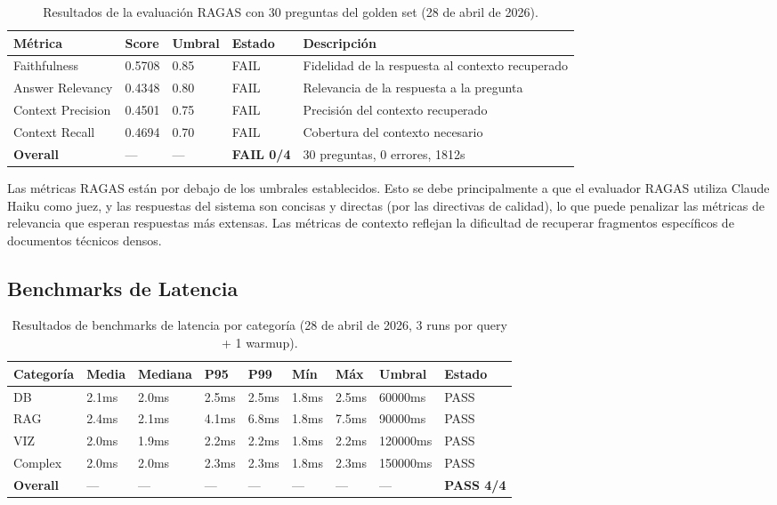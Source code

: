 ﻿\documentclass[11pt,a4paper]{article}
\begin{document}
\begin{table}[H]
\centering
\caption{Resultados de la evaluaci\'on RAGAS con 30 preguntas del golden set (28 de abril de 2026).}
\label{tab:ragas}
\begin{tabularx}{\textwidth}{lllll}
\toprule
\textbf{M\'etrica} & \textbf{Score} & \textbf{Umbral} & \textbf{Estado} & \textbf{Descripci\'on} \\
\midrule
Faithfulness & 0.5708 & 0.85 & \textcolor{accent}{FAIL} & Fidelidad de la respuesta al contexto recuperado \\
Answer Relevancy & 0.4348 & 0.80 & \textcolor{accent}{FAIL} & Relevancia de la respuesta a la pregunta \\
Context Precision & 0.4501 & 0.75 & \textcolor{accent}{FAIL} & Precisi\'on del contexto recuperado \\
Context Recall & 0.4694 & 0.70 & \textcolor{accent}{FAIL} & Cobertura del contexto necesario \\
\midrule
\textbf{Overall} & --- & --- & \textbf{\textcolor{accent}{FAIL 0/4}} & 30 preguntas, 0 errores, 1812s \\
\bottomrule
\end{tabularx}
\end{table}

Las m\'etricas RAGAS est\'an por debajo de los umbrales establecidos. Esto se debe principalmente a que el evaluador RAGAS utiliza Claude Haiku como juez, y las respuestas del sistema son concisas y directas (por las directivas de calidad), lo que puede penalizar las m\'etricas de relevancia que esperan respuestas m\'as extensas. Las m\'etricas de contexto reflejan la dificultad de recuperar fragmentos espec\'ificos de documentos t\'ecnicos densos.

\subsection{Benchmarks de Latencia}

\begin{table}[H]
\centering
\caption{Resultados de benchmarks de latencia por categor\'ia (28 de abril de 2026, 3 runs por query + 1 warmup).}
\label{tab:latency}
\begin{tabularx}{\textwidth}{lllllllll}
\toprule
\textbf{Categor\'ia} & \textbf{Media} & \textbf{Mediana} & \textbf{P95} & \textbf{P99} & \textbf{M\'in} & \textbf{M\'ax} & \textbf{Umbral} & \textbf{Estado} \\
\midrule
DB & 2.1ms & 2.0ms & 2.5ms & 2.5ms & 1.8ms & 2.5ms & 60000ms & \textcolor{success}{PASS} \\
RAG & 2.4ms & 2.1ms & 4.1ms & 6.8ms & 1.8ms & 7.5ms & 90000ms & \textcolor{success}{PASS} \\
VIZ & 2.0ms & 1.9ms & 2.2ms & 2.2ms & 1.8ms & 2.2ms & 120000ms & \textcolor{success}{PASS} \\
Complex & 2.0ms & 2.0ms & 2.3ms & 2.3ms & 1.8ms & 2.3ms & 150000ms & \textcolor{success}{PASS} \\
\midrule
\textbf{Overall} & --- & --- & --- & --- & --- & --- & --- & \textbf{\textcolor{success}{PASS 4/4}} \\
\bottomrule
\end{tabularx}
\end{table}
\end{document}
